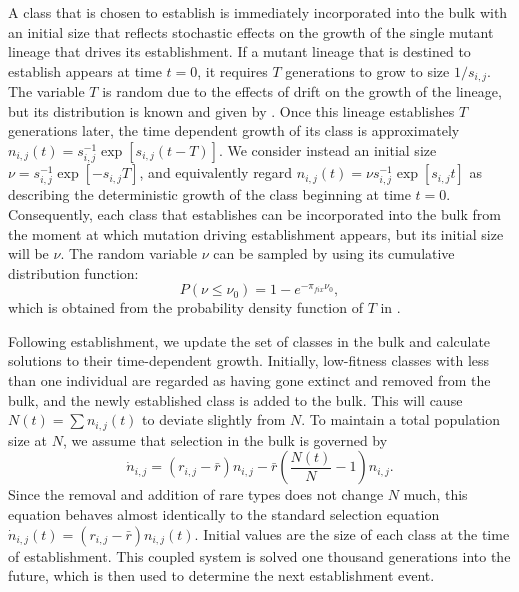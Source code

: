 \documentclass[9pt,twocolumn,twoside]{gsajnl}
\begin{document}
A class that is chosen to establish is immediately incorporated into the bulk with an initial size that reflects stochastic effects on the growth of the single mutant lineage that drives its establishment. If a mutant lineage that is destined to establish appears at time $t=0$, it requires $T$ generations to grow to size $1/s_{i,j}$. The variable $T$ is random due to the effects of drift on the growth of the lineage, but its distribution is known and given by \cite[Equation 12]{desai2007beneficial}.  Once this lineage establishes $T$ generations later, the time dependent growth of its class is approximately $n_{i,j}(t) =s_{i,j}^{-1} \exp[{s_{i,j}(t-T)}]$. We consider instead an initial size  $\nu = s_{i,j}^{-1}\exp[-s_{i,j}T]$, and equivalently regard $n_{i,j}(t) = \nu s_{i,j}^{-1} \exp[{s_{i,j}t}] $ as describing the deterministic growth of the class beginning at time $t=0$. Consequently, each class that establishes can be incorporated into the bulk from the moment at which mutation driving establishment appears, but its initial size will be $\nu$. The random variable $\nu$ can be sampled by using its cumulative distribution function:
\begin{equation}\label{eq:3}
P(\nu \leq \nu_0) = 1- e^{-\pi_{fix} \nu_0},
\end{equation}
which is obtained from the probability density function of  $T$ in \cite[Equation 12]{desai2007beneficial}.\par

Following establishment, we update the set of classes in the bulk and calculate solutions to their time-dependent growth. Initially, low-fitness classes with less than one individual are regarded as having gone extinct and removed from the bulk, and the newly established class is added to the bulk. This will cause $N(t)=\sum n_{i,j}(t)$ to deviate slightly from $N$. To  maintain a total population size at $N$, we assume that selection in the bulk is governed by \cite[p.133]{Crow1970}
\[ \dot{n}_{i,j} = (r_{i,j}-\bar{r})n_{i,j} - \bar{r}\left (\frac{N(t)}{N}-1 \right)n_{i,j}. \] 
Since the removal and addition of rare types does not change $N$ much, this equation behaves almost identically to the standard selection equation $\dot{n}_{i,j}(t) =(r_{i,j}-\bar{r})n_{i,j}(t)$. Initial values are the size of each class at the time of establishment. This coupled system is solved one thousand generations into the future, which is then used to determine the next establishment event. \par
\end{document}

